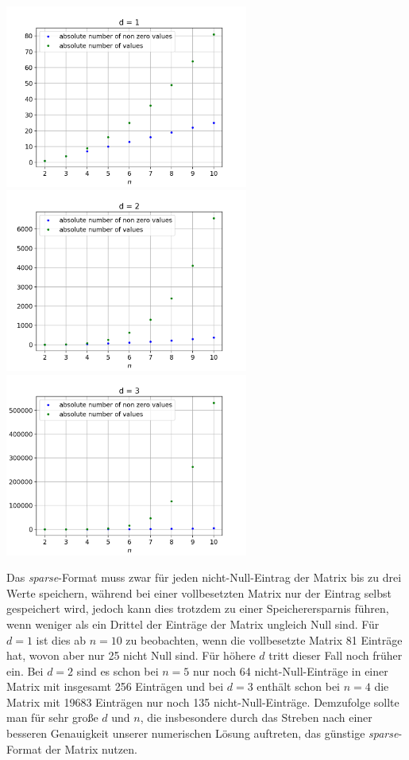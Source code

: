 \documentclass{scrartcl}
\begin{document}
\pagebreak
{
  \centering
    \includegraphics[width=0.6\textwidth]{Figure_1}
    \includegraphics[width=0.6\textwidth]{Figure_2}
    \includegraphics[width=0.6\textwidth]{Figure_3}
    \vspace{-0.2cm}
}
\vspace{0.5cm}

Das \textit{sparse}-Format muss zwar für jeden nicht-Null-Eintrag der Matrix bis zu drei Werte speichern, während bei einer vollbesetzten Matrix nur der Eintrag selbst gespeichert wird, jedoch kann dies trotzdem zu einer Speicherersparnis führen, wenn weniger als ein Drittel der Einträge der Matrix ungleich Null sind.
Für $d=1$ ist dies ab $n=10$ zu beobachten, wenn die vollbesetzte Matrix 81 Einträge hat, wovon aber nur 25 nicht Null sind. Für höhere $d$ tritt dieser Fall noch früher ein. Bei $d=2$ sind es schon bei $n=5$ nur noch 64 nicht-Null-Einträge in einer Matrix mit insgesamt 256 Einträgen und bei $d=3$ enthält schon bei $n=4$ die Matrix mit 19683 Einträgen nur noch 135 nicht-Null-Einträge.
Demzufolge sollte man für sehr große $d$ und $n$, die insbesondere durch das Streben nach einer besseren Genauigkeit unserer numerischen Lösung auftreten, das günstige \textit{sparse}-Format der Matrix nutzen.
\end{document}
